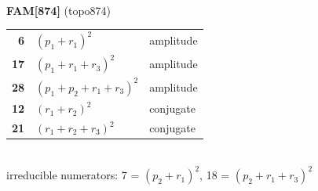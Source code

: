\documentclass[10pt]{article}
\begin{document}
\begin{minipage}[t]{0.48\textwidth}
{}\\[2mm]\textbf{FAM[874]} (topo874)\\[2pt]{\footnotesize\begin{tabular}{@{}r@{\ \ }l@{\ \ }l@{}}\textbf{6} & $(p_1+r_1)^2$ & amplitude\\
\textbf{17} & $(p_1+r_1+r_3)^2$ & amplitude\\
\textbf{28} & $(p_1+p_2+r_1+r_3)^2$ & amplitude\\
\textbf{12} & $(r_1+r_2)^2$ & conjugate\\
\textbf{21} & $(r_1+r_2+r_3)^2$ & conjugate\\\end{tabular}}\\[2pt]{\scriptsize irreducible numerators: 7 = $(p_2+r_1)^2$, 18 = $(p_2+r_1+r_3)^2$}\end{minipage}\hfill%
\end{document}
